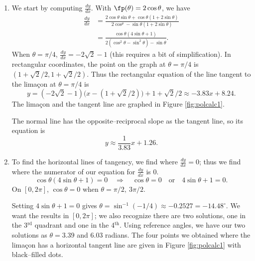 {\begin{enumerate}
	\item We start by computing $\frac{dy}{dx}$. With $\fp(\theta) = 2\cos\theta$, we have
	\begin{align*}
	\frac{dy}{dx} &= \frac{2\cos\theta\sin\theta + \cos\theta(1+2\sin\theta)}{2\cos^\theta-\sin\theta(1+2\sin\theta)}\\
	&= \frac{\cos\theta(4\sin\theta+1)}{2(\cos^2\theta-\sin^2\theta)-\sin\theta}.
	\end{align*}
	When $\theta=\pi/4$, $\frac{dy}{dx}=-2\sqrt{2}-1$ (this requires a bit of simplification). In rectangular coordinates, the point on the graph at $\theta=\pi/4$ is $(1+\sqrt{2}/2,1+\sqrt{2}/2)$. Thus the rectangular equation of the line tangent to the lima\c con at $\theta=\pi/4$ is 
	$$y=(-2\sqrt{2}-1)\big(x-(1+\sqrt{2}/2)\big)+1+\sqrt{2}/2 \approx  -3.83 x+8.24.$$ The lima\c con and the tangent line are graphed in Figure \ref{fig:polcalc1}. 
	
	The normal line has the opposite--reciprocal slope as the tangent line, so its equation is 
	$$y \approx \frac{1}{3.83}x+1.26.$$
	\drawexampleline
	
	\item		To find the horizontal lines of tangency, we find where $\frac{dy}{dx}=0$; thus we find where the numerator of our equation for $\frac{dy}{dx}$ is 0.
	$$\cos\theta(4\sin\theta+1)=0\quad \Rightarrow \quad \cos\theta=0 \quad \text{or}\quad 4\sin\theta+1=0.$$
	On $[0,2\pi]$, $\cos\theta=0$ when $\theta=\pi/2,\ 3\pi/2$. 

Setting $4\sin\theta+1=0$ gives $\theta=\sin^{-1}(-1/4)\approx -0.2527 = -14.48^\circ$. We want the results in $[0,2\pi]$; we also recognize there are two solutions, one in the 3$^\text{rd}$ quadrant and one in the 4$^\text{th}$. Using reference angles, we have our two solutions as $\theta =3.39$ and $6.03$ radians. The four points we obtained where the lima\c con has a horizontal tangent line are given in Figure \ref{fig:polcalc1} with black--filled dots.\\


\end{enumerate}}

